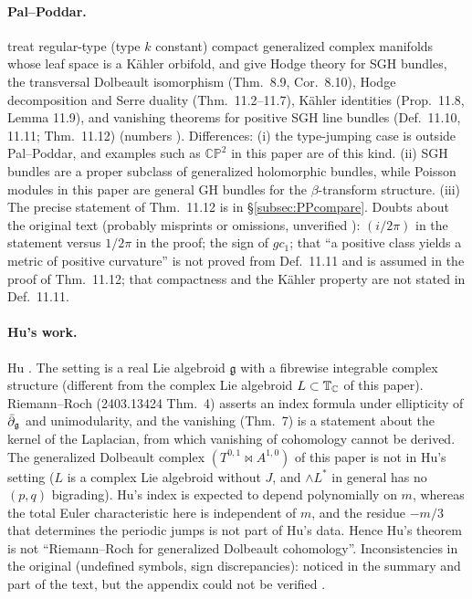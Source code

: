 \paragraph{Pal--Poddar.} \tC \cite{PP} treat regular-type (type $k$ constant) compact generalized complex manifolds whose leaf space is a K\"ahler orbifold, and give Hodge theory for SGH bundles, the transversal Dolbeault isomorphism (Thm.\ 8.9, Cor.\ 8.10), Hodge decomposition and Serre duality (Thm.\ 11.2--11.7), K\"ahler identities (Prop.\ 11.8, Lemma 11.9), and vanishing theorems for positive SGH line bundles (Def.\ 11.10, 11.11; Thm.\ 11.12) (numbers \tQ). Differences: (i) the type-jumping case is outside Pal--Poddar, and examples such as $\mathbb{CP}^2$ in this paper are of this kind. (ii) SGH bundles are a proper subclass of generalized holomorphic bundles, while Poisson modules in this paper are general GH bundles for the $\beta$-transform structure. (iii) The precise statement of Thm.\ 11.12 is in \S\ref{subsec:PPcompare}. Doubts about the original text (probably misprints or omissions, unverified \tQ): $(i/2\pi)$ in the statement versus $1/2\pi$ in the proof; the sign of $gc_1$; that ``a positive class yields a metric of positive curvature'' is not proved from Def.\ 11.11 and is assumed in the proof of Thm.\ 11.12; that compactness and the K\"ahler property are not stated in Def.\ 11.11.

\paragraph{Hu's work.} \tC Hu \cite{Hu1,Hu2}. The setting is a real Lie algebroid $\mathfrak g$ with a fibrewise integrable complex structure (different from the complex Lie algebroid $L\subset\mathbb T_\mathbb C$ of this paper). Riemann--Roch (2403.13424 Thm.\ 4) asserts an index formula under ellipticity of $\bar\partial_{\mathfrak g}$ and unimodularity, and the vanishing (Thm.\ 7) is a statement about the kernel of the Laplacian, from which vanishing of cohomology cannot be derived. \tP The generalized Dolbeault complex $(T^{0,1}\bowtie A^{1,0})$ of this paper is not in Hu's setting ($L$ is a complex Lie algebroid without $J$, and $\wedge L^*$ in general has no $(p,q)$ bigrading). \tK Hu's index is expected to depend polynomially on $m$, whereas the total Euler characteristic here is independent of $m$, and the residue $-m/3$ that determines the periodic jumps is not part of Hu's data. Hence Hu's theorem is not ``Riemann--Roch for generalized Dolbeault cohomology''. Inconsistencies in the original (undefined symbols, sign discrepancies): noticed in the summary and part of the text, but the appendix could not be verified \tQ.

